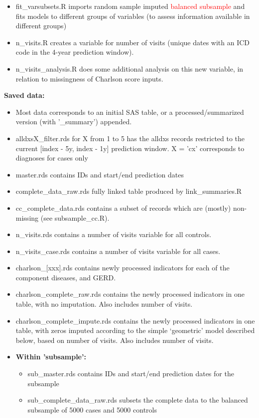 \documentclass[12pt]{article}
\newcommand{\note}[1]{\textcolor{red}{#1}}
\begin{document}
\begin{itemize}
  \item fit\_varsubsets.R imports random sample imputed \note{balanced subsample} and fits models to different groups of variables (to assess information available in different groups)
  \item n\_visits.R creates a variable for number of visits (unique dates with an ICD code in the 4-year prediction window).
  \item n\_visits\_analysis.R does some additional analysis on this new variable, in relation to missingness of Charlson score inputs.
\end{itemize}

{\bf Saved data:}
\begin{itemize}
  \item Most data corresponds to an initial SAS table, or a processed/summarized version (with '\_summary') appended.
  \item alldxsX\_filter.rds for X from 1 to 5 has the alldxs records restricted to the current [index - 5y, index - 1y] prediction window. X = 'cx' corresponds to diagnoses for cases only
  \item master.rds contains IDs and start/end prediction dates
  \item complete\_data\_raw.rds fully linked table produced by link\_summaries.R
  \item cc\_complete\_data.rds contains a subset of records which are (mostly) non-missing (see subsample\_cc.R).
  \item n\_visits.rds contains a number of visits variable for all controls.
  \item n\_visits\_case.rds contains a number of visits variable for all cases.
  \item charlson\_[xxx].rds contains newly processed indicators for each of the component diseases, and GERD.
  \item charlson\_complete\_raw.rds contains the newly processed indicators in one table, with no imputation. Also includes number of visits.
  \item charlson\_complete\_impute.rds contains the newly processed indicators in one table, with zeros imputed according to the simple `geometric' model described below, based on number of visits. Also includes number of visits.
  \item {\bf Within 'subsample':}
  \begin{itemize}
    \item sub\_master.rds contains IDs and start/end prediction dates for the subsample
    \item sub\_complete\_data\_raw.rds subsets the complete data to the balanced subsample of 5000 cases and 5000 controls

\end{itemize}
\end{itemize}
\end{document}
